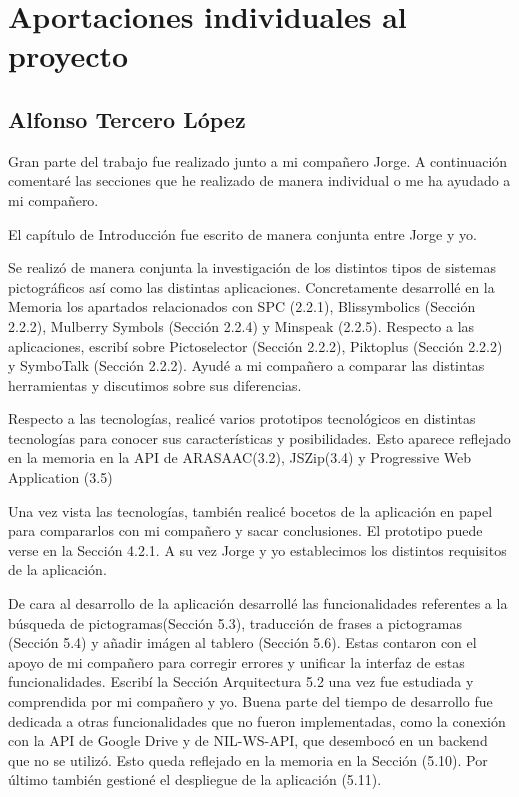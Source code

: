 \chapter{Aportaciones individuales al proyecto}
\label{cap:Aportacionesindividuales}

\section{Alfonso Tercero López}

Gran parte del trabajo fue realizado junto a mi compañero Jorge. A continuación comentaré las secciones que he realizado de manera individual o me ha ayudado a mi compañero.

El capítulo de Introducción fue escrito de manera conjunta entre Jorge y yo. 

Se realizó de manera conjunta la investigación de los distintos tipos de sistemas pictográficos así como las distintas aplicaciones. Concretamente desarrollé en la Memoria los apartados relacionados con SPC (2.2.1), Blissymbolics (Sección 2.2.2), Mulberry Symbols (Sección 2.2.4) y Minspeak (2.2.5). Respecto a las aplicaciones, escribí sobre Pictoselector (Sección 2.2.2), Piktoplus (Sección 2.2.2) y SymboTalk (Sección 2.2.2). Ayudé a mi compañero a comparar las distintas herramientas y discutimos sobre sus diferencias.

Respecto a las tecnologías, realicé varios prototipos tecnológicos en distintas tecnologías para conocer sus características y posibilidades. Esto aparece reflejado en la memoria en la API de ARASAAC(3.2), JSZip(3.4) y Progressive Web Application (3.5)

Una vez vista las tecnologías, también realicé bocetos de la aplicación en papel para compararlos con mi compañero y sacar conclusiones. El prototipo puede verse en la Sección 4.2.1. A su vez Jorge y yo establecimos los distintos requisitos de la aplicación. 

De cara al desarrollo de la aplicación desarrollé las funcionalidades referentes a la búsqueda de pictogramas(Sección 5.3), traducción de frases a pictogramas (Sección 5.4) y añadir imágen al tablero (Sección 5.6). Estas contaron con el apoyo de mi compañero para corregir errores y unificar la interfaz de estas funcionalidades. Escribí la Sección Arquitectura 5.2 una vez fue estudiada y comprendida por mi compañero y yo. Buena parte del tiempo de desarrollo fue dedicada a otras funcionalidades que no fueron implementadas, como la conexión con la API de Google Drive y  de NIL-WS-API, que desembocó en un backend que no se utilizó. Esto queda reflejado en la memoria en la Sección (5.10). Por último también gestioné el despliegue de la aplicación (5.11). 

